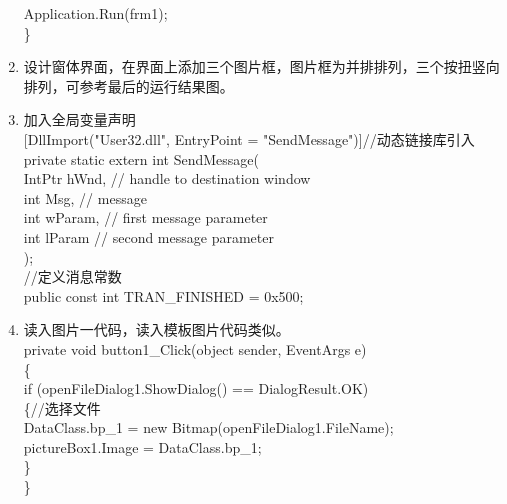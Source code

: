 ﻿\documentclass[12pt,a4paper,oneside]{book}
\begin{document}
\begin{enumerate}
\hspace*{6em}Application.Run(frm1);\\
\hspace*{4em}\}\\
\item 设计窗体界面，在界面上添加三个图片框，图片框为并排排列，三个按扭竖向排列，可参考最后的运行结果图。
\item 加入全局变量声明\\
\hspace*{4em}[DllImport("User32.dll", EntryPoint = "SendMessage")]//动态链接库引入\\
\hspace*{4em}private static extern int SendMessage(\\
\hspace*{4em}IntPtr hWnd, // handle to destination window \\
\hspace*{4em}int Msg, // message \\
\hspace*{4em}int wParam, // first message parameter \\
\hspace*{4em}int lParam // second message parameter \\
\hspace*{4em});\\
\hspace*{4em}//定义消息常数 \\
\hspace*{4em}public const int TRAN\_FINISHED = 0x500;\\

\item 读入图片一代码，读入模板图片代码类似。\\
\hspace*{4em}private void button1\_Click(object sender, EventArgs e)\\
\hspace*{4em}\{\\
\hspace*{6em}if (openFileDialog1.ShowDialog() == DialogResult.OK)\\
\hspace*{6em}\{//选择文件\\
\hspace*{8em}DataClass.bp\_1 = new Bitmap(openFileDialog1.FileName);\\
\hspace*{8em}pictureBox1.Image = DataClass.bp\_1;\\
\hspace*{6em}\}       \\
\hspace*{4em}\} \\    


\end{enumerate}
\end{document}

